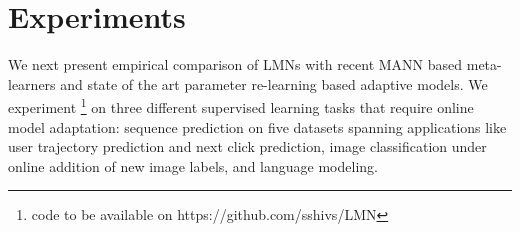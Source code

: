 \documentclass[letterpaper]{article} %
\newcommand{\vek}[1]{{\bf {#1}}}
\newcommand{\vh}{{\vek{h}}}
\begin{document}




\section{Experiments}
We next present empirical comparison of LMNs with recent MANN based meta-learners and state of the art parameter re-learning based adaptive models. We experiment \footnote{code to be available on https://github.com/sshivs/LMN} on three different supervised learning tasks that require online model adaptation: sequence prediction on five datasets spanning applications like user trajectory prediction and next click prediction,  image classification under online addition of new image labels, and language modeling.   
  
\end{document}
